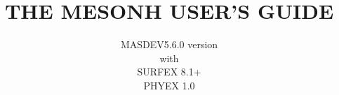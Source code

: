 \documentclass[11pt,a4paper]{book}
\begin{document}
\baselineskip=18pt
\newcommand{\dfrac}[2]{\frac{\displaystyle#1}{\displaystyle#2}}
\parindent=25pt

\setcounter{secnumdepth}{5}



\begin{titlepage}
\title{ {\bf THE MESONH USER'S GUIDE}}
\author{MASDEV5.6.0 version \\ with \\ SURFEX 8.1+ \\ PHYEX 1.0}
\end{titlepage}
\maketitle
\thispagestyle{empty}
\tableofcontents
















\appendix






\printindex
{}
{}
\end{document}
